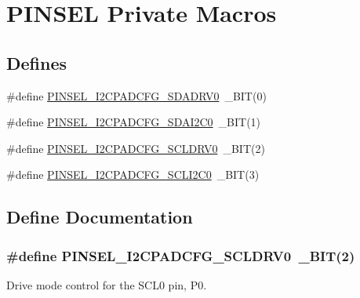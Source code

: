 \hypertarget{group___p_i_n_s_e_l___private___macros}{\section{\-P\-I\-N\-S\-E\-L \-Private \-Macros}
\label{group___p_i_n_s_e_l___private___macros}
}
\subsection*{\-Defines}
\begin{DoxyCompactItemize}
\item 
\#define \hyperlink{group___p_i_n_s_e_l___private___macros_ga8a299707e5701134a2cb2986c3e89143}{\-P\-I\-N\-S\-E\-L\-\_\-\-I2\-C\-P\-A\-D\-C\-F\-G\-\_\-\-S\-D\-A\-D\-R\-V0}~\-\_\-\-B\-I\-T(0)
\item 
\#define \hyperlink{group___p_i_n_s_e_l___private___macros_gacf54f139b5d19b1e076d275670b8bfde}{\-P\-I\-N\-S\-E\-L\-\_\-\-I2\-C\-P\-A\-D\-C\-F\-G\-\_\-\-S\-D\-A\-I2\-C0}~\-\_\-\-B\-I\-T(1)
\item 
\#define \hyperlink{group___p_i_n_s_e_l___private___macros_ga7ee73f8fec052b869ea634112485d40b}{\-P\-I\-N\-S\-E\-L\-\_\-\-I2\-C\-P\-A\-D\-C\-F\-G\-\_\-\-S\-C\-L\-D\-R\-V0}~\-\_\-\-B\-I\-T(2)
\item 
\#define \hyperlink{group___p_i_n_s_e_l___private___macros_ga2e19e5c328764503a265fbd2c4cbb718}{\-P\-I\-N\-S\-E\-L\-\_\-\-I2\-C\-P\-A\-D\-C\-F\-G\-\_\-\-S\-C\-L\-I2\-C0}~\-\_\-\-B\-I\-T(3)
\end{DoxyCompactItemize}


\subsection{\-Define \-Documentation}
\hypertarget{group___p_i_n_s_e_l___private___macros_ga7ee73f8fec052b869ea634112485d40b}{
\subsubsection[{\-P\-I\-N\-S\-E\-L\-\_\-\-I2\-C\-P\-A\-D\-C\-F\-G\-\_\-\-S\-C\-L\-D\-R\-V0}]{\setlength{\rightskip}{0pt plus 5cm}\#define {\bf \-P\-I\-N\-S\-E\-L\-\_\-\-I2\-C\-P\-A\-D\-C\-F\-G\-\_\-\-S\-C\-L\-D\-R\-V0}~\-\_\-\-B\-I\-T(2)}}\label{group___p_i_n_s_e_l___private___macros_ga7ee73f8fec052b869ea634112485d40b}
\-Drive mode control for the \-S\-C\-L0 pin, \-P0. 

